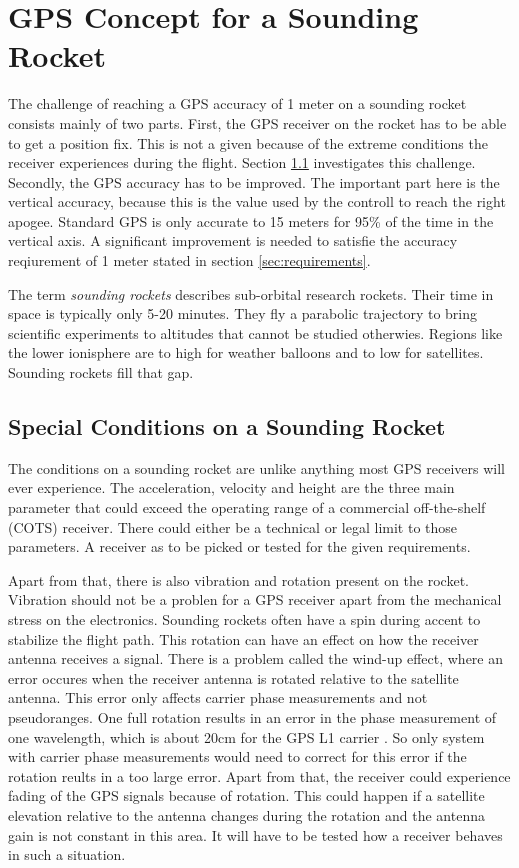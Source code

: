 \chapter{GPS Concept for a Sounding Rocket}

The challenge of reaching a GPS accuracy of 1 meter on a sounding rocket consists mainly of two parts.
First, the GPS receiver on the rocket has to be able to get a position fix.
This is not a given because of the extreme conditions the receiver experiences during the flight.
Section \ref{sec:special_conditions} investigates this challenge.
Secondly, the GPS accuracy has to be improved.
The important part here is the vertical accuracy, because this is the value used by the controll to reach the right apogee.
Standard GPS is only accurate to 15 meters for 95\% of the time in the vertical axis.
A significant improvement is needed to satisfie the accuracy reqiurement of 1 meter stated in section \ref{sec:requirements}.

The term \textit{sounding rockets} describes sub-orbital research rockets.
Their time in space is typically only 5-20 minutes.
They fly a parabolic trajectory to bring scientific experiments to altitudes that cannot be studied otherwies.
Regions like the lower ionisphere are to high for weather balloons and to low for satellites.
Sounding rockets fill that gap.
\cite{Sounding_Rockets}

\section{Special Conditions on a Sounding Rocket}\label{sec:special_conditions}

The conditions on a sounding rocket are unlike anything most GPS receivers will ever experience.
The acceleration, velocity and height are the three main parameter that could exceed the operating range of a commercial off-the-shelf (COTS) receiver.
There could either be a technical or legal limit to those parameters.
A receiver as to be picked or tested for the given requirements.

Apart from that, there is also vibration and rotation present on the rocket.
Vibration should not be a problen for a GPS receiver apart from the mechanical stress on the electronics.
Sounding rockets often have a spin during accent to stabilize the flight path.
This rotation can have an effect on how the receiver antenna receives a signal.
There is a problem called the wind-up effect, where an error occures when the receiver antenna is rotated relative to the satellite antenna.
This error only affects carrier phase measurements and not pseudoranges.
One full rotation results in an error in the phase measurement of one wavelength, which is about 20cm for the GPS L1 carrier \cite{Wind_up}. 
So only system with carrier phase measurements would need to correct for this error if the rotation reults in a too large error.
Apart from that, the receiver could experience fading of the GPS signals because of rotation.
This could happen if a satellite elevation relative to the antenna changes during the rotation and the antenna gain is not constant in this area.
It will have to be tested how a receiver behaves in such a situation.

